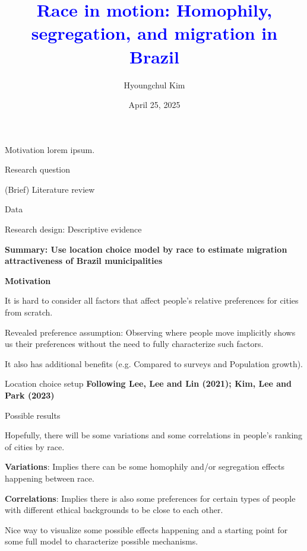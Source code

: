 \documentclass[notes,11pt, aspectratio=169]{beamer}
\title{\textcolor{blue}{Race in motion: Homophily, segregation, and migration in Brazil}}
\author{Hyoungchul Kim}
\institute{Wharton, UPenn}
\date{April 25, 2025}
\newenvironment{wideitemize}{\itemize\addtolength{\itemsep}{0.4em}}{\enditemize}
\begin{document}
\begin{frame}[plain]
	\titlepage
\end{frame}

\setcounter{framenumber}{0}

\begin{frame}{Motivation}
	lorem ipsum.
\end{frame}

\begin{frame}{Research question}
	
\end{frame}

\begin{frame}{(Brief) Literature review}
	
\end{frame}

\begin{frame}{Data}
	
\end{frame}

\begin{frame}{Research design: Descriptive evidence}

	\textbf{Summary: Use location choice model by race to estimate migration attractiveness of Brazil municipalities}\vspace{1.5em}

\textbf{Motivation}
\begin{wideitemize}
	\item It is hard to consider all factors that affect people's relative preferences for cities from scratch.
	\item Revealed preference assumption: Observing where people move implicitly shows us their preferences without the need to fully characterize such factors.
	\item It also has additional benefits (e.g. Compared to surveys and Population growth).
\end{wideitemize}
	
\end{frame}

\begin{frame}{Location choice setup}
	\textbf{Following Lee, Lee and Lin (2021); Kim, Lee and Park (2023)}
\end{frame}

\begin{frame}{Possible results}
\begin{wideitemize}
	\item Hopefully, there will be some variations and some correlations in people's ranking of cities by race.
	\item \textbf{Variations}: Implies there can be some homophily and/or segregation effects happening between race.
	\item \textbf{Correlations}: Implies there is also some preferences for certain types of people with different ethical backgrounds to be close to each other. 
	\item Nice way to visualize some possible effects happening and a starting point for some full model to characterize possible mechanisms.
\end{wideitemize}	
\end{frame}
\end{document}
